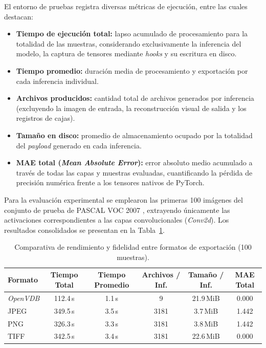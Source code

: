 El entorno de pruebas registra diversas métricas de ejecución, entre las cuales destacan:
\begin{itemize}
    \item \textbf{Tiempo de ejecución total:} lapso acumulado de procesamiento para la totalidad de las muestras, 
    considerando exclusivamente la inferencia del modelo, la captura de tensores mediante \textit{hooks} y su 
    escritura en disco.
    \item \textbf{Tiempo promedio:} duración media de procesamiento y exportación por cada inferencia individual.
    \item \textbf{Archivos producidos:} cantidad total de archivos generados por inferencia (excluyendo la imagen 
    de entrada, la reconstrucción visual de salida y los registros de cajas).
    \item \textbf{Tamaño en disco:} promedio de almacenamiento ocupado por la totalidad del \textit{payload} 
    generado en cada inferencia.
    \item \textbf{MAE total (\textit{Mean Absolute Error}):} error absoluto medio acumulado a través de todas 
    las capas y muestras evaluadas, cuantificando la pérdida de precisión numérica frente a los tensores nativos 
    de PyTorch.
\end{itemize}

Para la evaluación experimental se emplearon las primeras 100 imágenes del conjunto de prueba de PASCAL VOC 
2007 \parencite{pascal_voc_2007}, extrayendo únicamente las activaciones correspondientes a las capas 
convolucionales (\textit{Conv2d}). Los resultados consolidados se presentan en la Tabla~\ref{tab:benchmark_extraccion}.

\begin{table}[htbp]
\centering
\caption{Comparativa de rendimiento y fidelidad entre formatos de exportación (100 muestras).}
\label{tab:benchmark_extraccion}
\small
\begin{tabular}{lccccc}
\hline
\textbf{Formato} & \textbf{Tiempo Total} & \textbf{Tiempo Promedio} & \textbf{Archivos / Inf.} & \textbf{Tamaño / Inf.} & \textbf{MAE Total} \\ \hline
\textit{OpenVDB} & 112.4\,s & 1.1\,s & 9    & 21.9\,MiB & 0.000 \\
JPEG             & 349.5\,s & 3.5\,s & 3181 & 3.7\,MiB  & 1.442 \\
PNG              & 326.3\,s & 3.3\,s & 3181 & 3.8\,MiB  & 1.442 \\
TIFF             & 342.5\,s & 3.4\,s & 3181 & 22.6\,MiB & 0.000 \\ \hline
\end{tabular}
\end{table}

